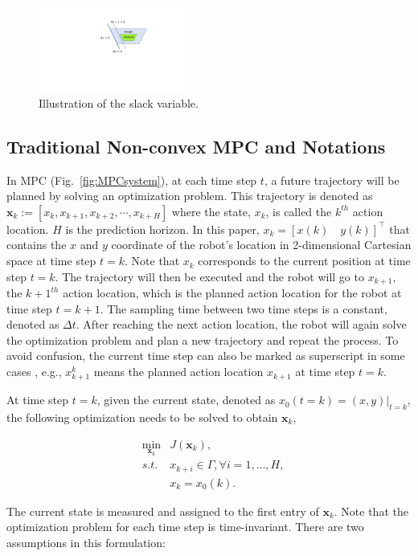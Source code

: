 \documentclass[letterpaper, 10 pt, conference]{ieeeconf}  %
\begin{document}
\begin{figure}[t]
      \centering
      \includegraphics[width=5cm]{plot/slack.pdf}
      \caption{Illustration of the slack variable. }
      \label{fig:slack}
\end{figure}

\subsection{Traditional Non-convex MPC and Notations}
In MPC (Fig.~\ref{fig:MPCsystem}), at each time step $t$, a future trajectory will be planned by solving an optimization problem. This trajectory is denoted as $\mathbf{x}_{k} := [x_k, x_{k+1},x_{k+2},\cdots,x_{k+H}]$ where the state, $x_k$, is called the $k^{th}$ action location. $H$ is the prediction horizon. In this paper, $x_k= [x(k)\quad y(k)]^{\intercal}$ that contains the $x$ and $y$ coordinate of the robot's location in 2-dimensional Cartesian space at time step $t=k$. Note that $x_k$ corresponds to the current position at time step $t=k$. The trajectory will then be executed and the robot will go to $x_{k+1}$, the $k+1^{th}$ action location, which is the planned action location for the robot at time step $t=k+1$. The sampling time between two time steps is a constant, denoted as $\Delta t$. After reaching the next action location, the robot will again solve the optimization problem and plan a new trajectory and repeat the process. To avoid confusion, the current time step can also be marked as superscript in some cases , e.g., $x_{k+1}^k$ means the planned action location $x_{k+1}$ at time step $t=k$.

At time step $t=k$, given the current state, denoted as $x_0(t=k) = (x,y)|_{t=k}$, the following optimization needs to be solved to obtain $\mathbf{x}_k$,


\begin{eqnarray}
&\min_{\mathbf{x}_{k}} & J(\mathbf{x}_k),\\
&s.t.& x_{k+i}\in\Gamma,\forall i=1,\ldots,H,\\
&&         x_{k}=x_0(k).
\end{eqnarray}

The current state is measured and assigned to the first entry of $\mathbf{x}_{k}$. Note that the optimization problem for each time step is time-invariant. There are two assumptions in this formulation: 
\end{document}
